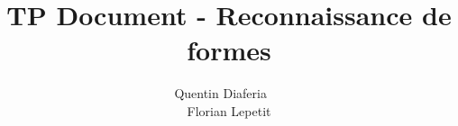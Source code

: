 \documentclass[a4paper,12pt]{article}
\title{TP Document - Reconnaissance de formes}
\author{Quentin Diaferia ~~\\ Florian Lepetit}
\begin{document}
\maketitle

\begin{center}
\end{center}

\newpage

\tableofcontents

\newpage



\newpage



\newpage



\newpage



\newpage


\end{document}
